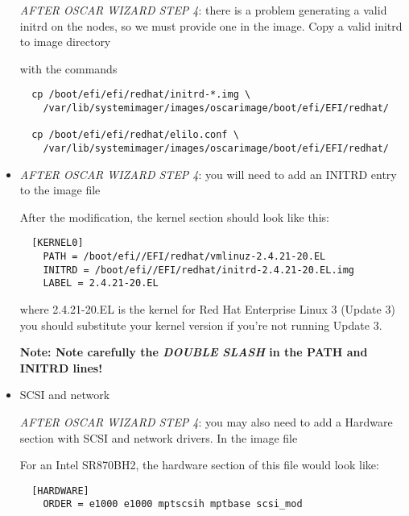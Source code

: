 \begin{itemize}
\emph{AFTER OSCAR WIZARD STEP 4}: there is a problem generating a valid initrd on the
nodes, so we must provide one in the image.  Copy a valid initrd to image
directory


with the commands

\begin{verbatim}
  cp /boot/efi/efi/redhat/initrd-*.img \
    /var/lib/systemimager/images/oscarimage/boot/efi/EFI/redhat/

  cp /boot/efi/efi/redhat/elilo.conf \
    /var/lib/systemimager/images/oscarimage/boot/efi/EFI/redhat/
\end{verbatim}


\item {}

\emph{AFTER OSCAR WIZARD STEP 4}: you will need to add an INITRD entry to the image
file


After the modification, the kernel section should look like this:

\begin{verbatim}
  [KERNEL0]
    PATH = /boot/efi//EFI/redhat/vmlinuz-2.4.21-20.EL
    INITRD = /boot/efi//EFI/redhat/initrd-2.4.21-20.EL.img
    LABEL = 2.4.21-20.EL
\end{verbatim}

where 2.4.21-20.EL is the kernel for Red Hat Enterprise Linux 3 (Update 3)
you should substitute your kernel version if you're not running Update 3.

{\bf Note: Note carefully the \emph{DOUBLE SLASH} in the PATH and INITRD lines!}


\item SCSI and network

\emph{AFTER OSCAR WIZARD STEP 4}: you may also need to add a Hardware section with
SCSI and network drivers.  In the image file


For an Intel SR870BH2, the hardware section of this file would look like:

\begin{verbatim}
  [HARDWARE]
    ORDER = e1000 e1000 mptscsih mptbase scsi_mod
\end{verbatim}



\end{itemize}
